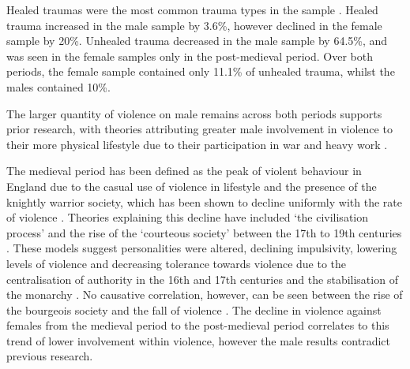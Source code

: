 Healed traumas were the most common trauma types in the sample  . 
Healed trauma increased in the male sample by 3.6\%, however declined in the female sample by 20\%. Unhealed trauma decreased in the male sample by 64.5\%, and was seen in the female samples only in the post-medieval period. Over both periods, the female sample contained only 11.1\% of unhealed trauma, whilst the males contained 10\%. 

%
The larger quantity of violence on male remains across both periods supports prior research, with theories attributing greater male involvement in violence to their more physical lifestyle due to their participation in war and heavy work \parencite{roberts2003}.  

The medieval period has been defined as the peak of violent behaviour in England due to the casual use of violence in lifestyle and the presence of the knightly warrior society, which has been shown to decline uniformly with the rate of violence \parencites{beattie1974}{samaha1974}{hanawalt1976}{given1977}{cockburn1977}. 
Theories explaining this decline have included ‘the civilisation process’ and the rise of the ‘courteous society’ between the 17th to 19th centuries \parencites{beattie1974}{samaha1974}{hanawalt1976}{given1977}{cockburn1977}. 
These models suggest personalities were altered, declining impulsivity, lowering levels of violence and decreasing tolerance towards violence due to the centralisation of authority in the 16th and 17th centuries and the stabilisation of the monarchy \parencites{elias1976}{eisner2001}{eisner2003}. 
No causative correlation, however, can be seen between the rise of the bourgeois society and the fall of violence \parencites{gurr1981}[22]{stone1983}{sharpe1985}.  
The decline in violence against females from the medieval period to the post-medieval period correlates to this trend of lower involvement within violence, however the male results contradict previous research. 

